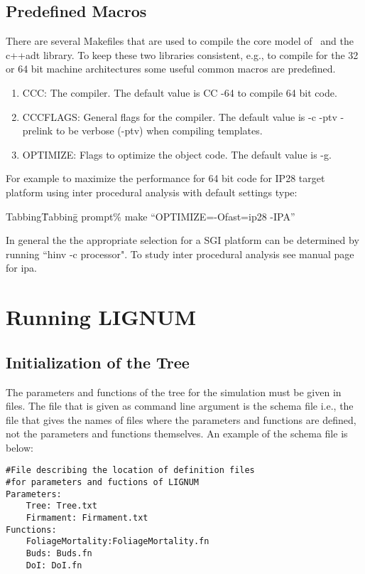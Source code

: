 \subsection{Predefined Macros}

There are several Makefiles that are used to compile the core model of
\lignum\ and the c++adt library.   To  keep  these  two
libraries consistent,  e.g., to compile for  the 32 or  64 bit machine
architectures some useful common macros are predefined.

\begin{enumerate}
\item CCC: The compiler. The default value is CC -64 to compile 64 bit code.
\item CCCFLAGS: General flags for the compiler. The default value is 
 -c -ptv -prelink to be verbose (-ptv) when compiling templates.
\item OPTIMIZE: Flags to optimize the object code. The default value
is -g.
\end{enumerate}
For example to maximize the performance for 64 bit code for IP28
target platform using inter procedural analysis with default settings type:
\begin{tabbing}
Tabbing\= Tabbing\=\kill 
\>\>prompt\% make ``OPTIMIZE=-Ofast=ip28 -IPA''
\end{tabbing}

In general  the the  appropriate selection for  a SGI platform  can be
determined by running  ``hinv -c processor". To study inter procedural
analysis see manual page for ipa.


\section{Running LIGNUM}

\subsection{Initialization of the Tree}

The parameters and functions of the tree for the simulation 
must be given in files. The file that is given as command 
line argument is the schema file i.e., the file that gives the 
names of files where the parameters and functions are defined, 
not the parameters and functions themselves. An example of the schema file
is below:

\begin{verbatim}
#File describing the location of definition files
#for parameters and fuctions of LIGNUM
Parameters:
    Tree: Tree.txt 
    Firmament: Firmament.txt
Functions:
    FoliageMortality:FoliageMortality.fn
    Buds: Buds.fn
    DoI: DoI.fn
\end{verbatim}

